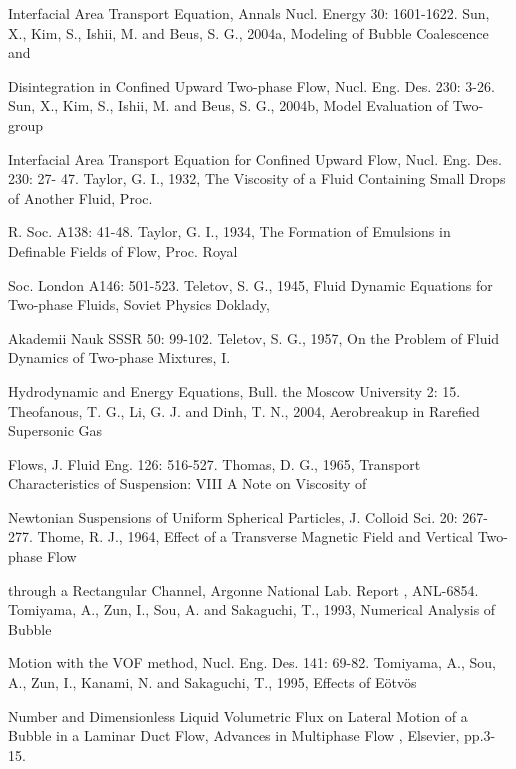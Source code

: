\documentclass[11pt,a4paper,openany,fontset=none]{ctexbook}
\begin{document}
{\small\raggedright\noindent Interfacial Area Transport Equation, Annals Nucl. Energy 30: 1601-1622. Sun, X., Kim, S., Ishii, M. and Beus, S. G., 2004a, Modeling of Bubble Coalescence and\par}
{\small\raggedright\noindent Disintegration in Confined Upward Two-phase Flow, Nucl. Eng. Des. 230: 3-26. Sun, X., Kim, S., Ishii, M. and Beus, S. G., 2004b, Model Evaluation of Two-group\par}
{\small\raggedright\noindent Interfacial Area Transport Equation for Confined Upward Flow, Nucl. Eng. Des. 230: 27- 47. Taylor, G. I., 1932, The Viscosity of a Fluid Containing Small Drops of Another Fluid, Proc.\par}
{\small\raggedright\noindent R. Soc. A138: 41-48. Taylor, G. I., 1934, The Formation of Emulsions in Definable Fields of Flow, Proc. Royal\par}
{\small\raggedright\noindent Soc. London A146: 501-523. Teletov, S. G., 1945, Fluid Dynamic Equations for Two-phase Fluids, Soviet Physics Doklady,\par}
{\small\raggedright\noindent Akademii Nauk SSSR 50: 99-102. Teletov, S. G., 1957, On the Problem of Fluid Dynamics of Two-phase Mixtures, I.\par}
{\small\raggedright\noindent Hydrodynamic and Energy Equations, Bull. the Moscow University 2: 15. Theofanous, T. G., Li, G. J. and Dinh, T. N., 2004, Aerobreakup in Rarefied Supersonic Gas\par}
{\small\raggedright\noindent Flows, J. Fluid Eng. 126: 516-527. Thomas, D. G., 1965, Transport Characteristics of Suspension: VIII A Note on Viscosity of\par}
{\small\raggedright\noindent Newtonian Suspensions of Uniform Spherical Particles, J. Colloid Sci. 20: 267-277. Thome, R. J., 1964, Effect of a Transverse Magnetic Field and Vertical Two-phase Flow\par}
{\small\raggedright\noindent through a Rectangular Channel, Argonne National Lab. Report , ANL-6854. Tomiyama, A., Zun, I., Sou, A. and Sakaguchi, T., 1993, Numerical Analysis of Bubble\par}
{\small\raggedright\noindent Motion with the VOF method, Nucl. Eng. Des. 141: 69-82. Tomiyama, A., Sou, A., Zun, I., Kanami, N. and Sakaguchi, T., 1995, Effects of Eötvös\par}
{\small\raggedright\noindent Number and Dimensionless Liquid Volumetric Flux on Lateral Motion of a Bubble in a Laminar Duct Flow, Advances in Multiphase Flow , Elsevier, pp.3-15.\par}
\end{document}
